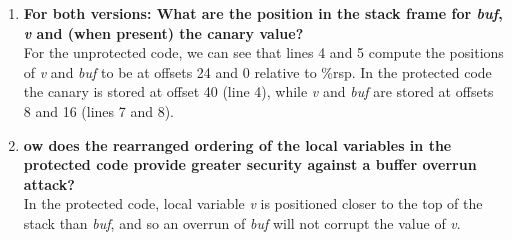 \documentclass{article}
\begin{document}
\begin{enumerate}[label=\textbf{\Alph*.}]
	\item \textbf{For both versions: What are the position in the stack frame for
	\textit{buf}, \textit{v} and (when present) the canary value?} \\
	For the unprotected code, we can see that lines 4 and 5 compute the positions of
	\textit{v} and \textit{buf} to be at offsets 24 and 0 relative to \%rsp. In the
	protected code the canary is stored at offset 40 (line 4), while \textit{v} and
	\textit{buf} are stored at offsets 8 and 16 (lines 7 and 8).
	\item \textbf{ow does the rearranged ordering of the local variables in the
	protected code provide greater security against a buffer overrun attack?} \\
	In the protected code, local variable \textit{v} is positioned closer to the top
	of the stack than \textit{buf}, and so an overrun of \textit{buf} will not
	corrupt the value of \textit{v}.
\end{enumerate}
\end{document}
